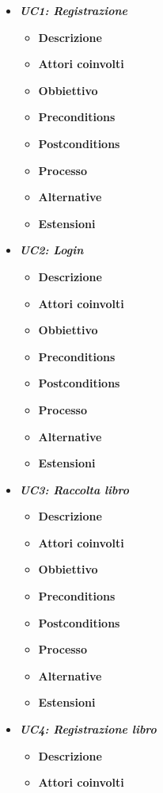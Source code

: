 

\begin{itemize}
	\item \textbf{\textit{UC1: Registrazione}}
	\begin{itemize}
		\item \textbf{Descrizione} 
		\item \textbf{Attori coinvolti} 
		\item \textbf{Obbiettivo}
		\item \textbf{Preconditions}
		\item \textbf{Postconditions}
		\item \textbf{Processo}
		\item \textbf{Alternative}
		\item \textbf{Estensioni}
	\end{itemize}
	\item \textbf{\textit{UC2: Login}}
	\begin{itemize}
		\item \textbf{Descrizione}
		\item \textbf{Attori coinvolti}
		\item \textbf{Obbiettivo}
		\item \textbf{Preconditions}
		\item \textbf{Postconditions}
		\item \textbf{Processo}
		\item \textbf{Alternative}
		\item \textbf{Estensioni}
	\end{itemize}
	\item \textit{\textbf{UC3: Raccolta libro}}
	\begin{itemize}
		\item \textbf{Descrizione}
		\item \textbf{Attori coinvolti}
		\item \textbf{Obbiettivo}
		\item \textbf{Preconditions}
		\item \textbf{Postconditions}
		\item \textbf{Processo}
		\item \textbf{Alternative}
		\item \textbf{Estensioni}
	\end{itemize}
	\item \textbf{\textit{UC4: Registrazione libro}}
	\begin{itemize}
		\item \textbf{Descrizione}
		\item \textbf{Attori coinvolti}

\end{itemize}
\end{itemize}
